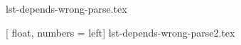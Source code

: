 \documentclass{article}
\begin{document}
{lst-depends-wrong-parse.tex}


[
    float,
    numbers  = left]
{lst-depends-wrong-parse2.tex}
\end{document}
